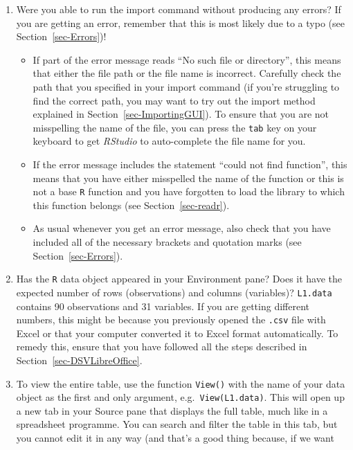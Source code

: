 \documentclass[
  letterpaper,
  DIV=11,
  numbers=noendperiod]{scrreprt}
\begin{document}
\begin{enumerate}
\def\labelenumi{\arabic{enumi}.}
\item
  Were you able to run the import command without producing any errors?
  If you are getting an error, remember that this is most likely due to
  a typo (see Section~\ref{sec-Errors})!

  \begin{itemize}
  \item
    If part of the error message reads ``No such file or directory'',
    this means that either the file path or the file name is incorrect.
    Carefully check the path that you specified in your import command
    (if you're struggling to find the correct path, you may want to try
    out the import method explained in Section~\ref{sec-ImportingGUI}).
    To ensure that you are not misspelling the name of the file, you can
    press the \texttt{tab} key on your keyboard to get \emph{RStudio} to
    auto-complete the file name for you.
  \item
    If the error message includes the statement ``could not find
    function'', this means that you have either misspelled the name of
    the function or this is not a base \texttt{R} function and you have
    forgotten to load the library to which this function belongs (see
    Section~\ref{sec-readr}).
  \item
    As usual whenever you get an error message, also check that you have
    included all of the necessary brackets and quotation marks (see
    Section~\ref{sec-Errors}).
  \end{itemize}
\item
  Has the \texttt{R} data object appeared in your Environment pane? Does
  it have the expected number of rows (observations) and columns
  (variables)? \texttt{L1.data} contains 90 observations and 31
  variables. If you are getting different numbers, this might be because
  you previously opened the \texttt{.csv} file with Excel or that your
  computer converted it to Excel format automatically. To remedy this,
  ensure that you have followed all the steps described in
  Section~\ref{sec-DSVLibreOffice}.
\item
  To view the entire table, use the function \texttt{View()} with the
  name of your data object as the first and only argument,
  e.g.~\texttt{View(L1.data)}. This will open up a new tab in your
  Source pane that displays the full table, much like in a spreadsheet
  programme. You can search and filter the table in this tab, but you
  cannot edit it in any way (and that's a good thing because, if we want

\end{enumerate}
\end{document}

